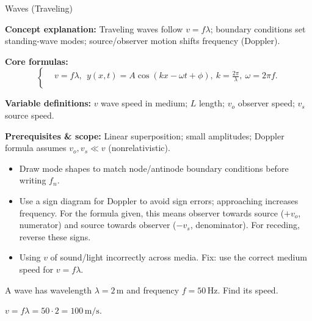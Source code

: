 \begin{KnowledgePoint}{Waves (Traveling) \Core}
  \KPFormulas
  \begin{formulabox}
  \textbf{Concept explanation:} Traveling waves follow $v=f\lambda$; boundary conditions set standing-wave modes; source/observer motion shifts frequency (Doppler).

  \textbf{Core formulas:}
  \[
  \left\{\begin{aligned}
    &v=f\lambda,\ \ y(x,t)=A\cos(kx-\omega t+\phi),\ k=\tfrac{2\pi}{\lambda},\ \omega=2\pi f.\\
  \end{aligned}\right.
  \]

  \textbf{Variable definitions:} $v$ wave speed in medium; $L$ length; $v_o$ observer speed; $v_s$ source speed.

  \textbf{Prerequisites \& scope:} Linear superposition; small amplitudes; Doppler formula assumes $v_o,v_s\ll v$ (nonrelativistic).
  \end{formulabox}

  \KPHeuristics
  \begin{heuristicsbox}
  \begin{itemize}[leftmargin=*]
    \item Draw mode shapes to match node/antinode boundary conditions before writing $f_n$.
    \item Use a sign diagram for Doppler to avoid sign errors; approaching increases frequency. For the formula given, this means observer towards source ($+v_o$, numerator) and source towards observer ($-v_s$, denominator). For receding, reverse these signs.
  \end{itemize}
  \vspace{0.4em}
  \begin{itemize}[leftmargin=*]
    \item Using $v$ of sound/light incorrectly across media. Fix: use the correct medium speed for $v=f\lambda$.
  \end{itemize}
  \end{heuristicsbox}

  \KPProblems
  \begin{cheatproblem}
  A wave has wavelength $\lambda=2\,\text{m}$ and frequency $f=50\,\text{Hz}$. Find its speed.
  \begin{solutionbox}
  $v=f\lambda=50\cdot2=100\,\text{m/s}$.
  \end{solutionbox}
  \end{cheatproblem}
\end{KnowledgePoint}

